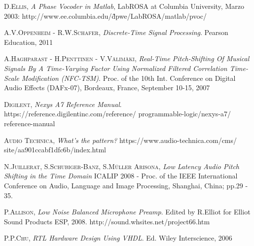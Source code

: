 \documentclass[a4paper, 11pt, oneside, openright]{report}
\begin{document}
\begin{thebibliography}{aaa}

	\textsc{D.Ellis},
	\textit{A Phase Vocoder in Matlab},
	LabROSA at Columbia University,
	Marzo 2003: 
	http://www.ee.columbia.edu/\~dpwe/LabROSA/matlab/pvoc/
	
	\textsc{A.V.Oppenheim - R.W.Schafer},
	\textit{Discrete-Time Signal Processing}.
	Pearson Education, 2011
	
	\textsc{A.Haghparast - H.Penttinen - V.Välimäki},
	\textit{Real-Time Pitch-Shifting Of Musical Signals By A Time-Varying Factor Using Normalized Filtered Correlation Time-Scale Modification (NFC-TSM)}.
	Proc. of the 10th Int. Conference on Digital Audio Effects (DAFx-07), Bordeaux, France, September 10-15, 2007
	
	\textsc{Digilent},
	\textit{Nexys A7 Reference Manual}.
	https://reference.digilentinc.com/reference/ programmable-logic/nexys-a7/	  reference-manual
	
	\textsc{Audio Technica},
	\textit{What's the pattern?}
	https://www.audio-technica.com/cms/ site/aa901ccabf1dfc6b/index.html
	
	\textsc{N.Juillerat, S.Schubiger-Banz, S.Müller Arisona},
	\textit{Low Latency Audio Pitch Shifting in the Time Domain}
	ICALIP 2008 - Proc. of the IEEE International Conference on Audio, Language and Image Processing, Shanghai, China; pp.29 - 35.
	
	\textsc{P.Allison},
	\textit{Low Noise Balanced Microphone Preamp}.
	Edited by R.Elliot for	
	Elliot Sound Products ESP, 2008.
	http://sound.whsites.net/project66.htm
	
	\textsc{P.P.Chu},
	\textit{RTL Hardware Design Using VHDL}.
	Ed. Wiley Interscience, 2006
	
\end{thebibliography}
\end{document}
